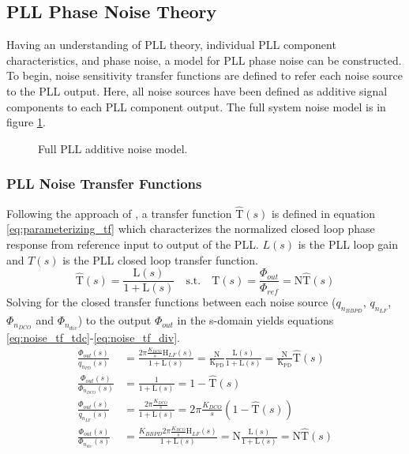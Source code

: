 \subsection{PLL Phase Noise Theory}\label{ntfs}
	Having an understanding of PLL theory, individual PLL component characteristics, and phase noise, a model for PLL phase noise can be constructed. To begin, noise sensitivity transfer functions are defined to refer each noise source to the PLL output. Here, all noise sources have been defined as additive signal components to each PLL component output. The full system noise model is in figure \ref{fig:full_pll_noise}.
	\begin{figure}[htb!]
		\center
		\caption{Full PLL additive noise model.}
		\label{fig:full_pll_noise}
	\end{figure}
	\FloatBarrier
	\subsubsection{PLL Noise Transfer Functions}
	Following the approach of \cite{perrott_2002}, a transfer function $\hat{\mathrm{T}}(s)$ is defined in equation \ref{eq:parameterizing_tf} which characterizes the normalized closed loop phase response from reference input to output of the PLL. $L(s)$ is the PLL loop gain and $T(s)$ is the PLL closed loop transfer function. 
	\begin{equation}\label{eq:parameterizing_tf}
	\hat{\mathrm{T}}(s) = \frac{\mathrm{L}(s)}{1+\mathrm{L}(s)}\hspace{1em} \text{s.t.} \hspace{1em} \mathrm{T}(s) = \frac{\Phi_{out}}{\Phi_{ref}} = \mathrm{N}\hat{\mathrm{T}}(s) 
	\end{equation}
	Solving for the closed transfer functions between each noise source ($q_{n_{BBPD}}$, $q_{n_{LF}}$, $\Phi_{n_{DCO}}$ and $\Phi_{n_{div}}$) to the output $\Phi_{out}$ in the s-domain yields equations \ref{eq:noise_tf_tdc}-\ref{eq:noise_tf_div}.
	\begin{align}
		\frac{\Phi_{out}(s)}{q_{n_{PD}}(s)} & = \frac{2\pi\frac{K_{DCO}}{s}\mathrm{H}_{LF}(s)}{1+\mathrm{L}(s)}= \frac{\mathrm{N}}{\mathrm{K_{PD}}}\frac{\mathrm{L}(s)}{1+\mathrm{L}(s)} = \frac{\mathrm{N}}{\mathrm{K_{PD}}}\hat{\mathrm{T}}(s)\label{eq:noise_tf_tdc}\\
		\frac{\Phi_{out}(s)}{\Phi_{n_{DCO}}(s)} & = \frac{1}{1+\mathrm{L}(s)}= 1-\hat{\mathrm{T}}(s)\\
		\frac{\Phi_{out}(s)}{q_{n_{LF}}(s)} & = \frac{2\pi\frac{K_{DCO}}{s}}{1+\mathrm{L}(s)} = 2\pi\frac{K_{DCO}}{s}(1-\hat{\mathrm{T}}(s))\\
		\frac{\Phi_{out}(s)}{\Phi_{n_{div}}(s)} & =\frac{K_{BBPD} 2\pi \frac{K_{DCO}}{s}\mathrm{H}_{LF}(s)}{1+\mathrm{L}(s)}= \mathrm{N}\frac{\mathrm{L}(s)}{1+\mathrm{L}(s)} = \mathrm{N}\hat{\mathrm{T}}(s)\label{eq:noise_tf_div}
	\end{align}

